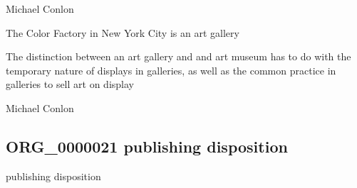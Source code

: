 \documentclass[letterpaper,10pt,english]{sphinxmanual}
\begin{document}
\begin{sphinxShadowBox}

\sphinxAtStartPar
Michael Conlon 
\end{sphinxShadowBox}

\begin{sphinxShadowBox}

\sphinxAtStartPar
The Color Factory in New York City is an art gallery
\end{sphinxShadowBox}

\begin{sphinxShadowBox}

\sphinxAtStartPar
The distinction between an art gallery and and art museum has to do with the temporary nature of displays in galleries, as well as the common practice in galleries to sell art on display
\end{sphinxShadowBox}

\begin{sphinxShadowBox}

\sphinxAtStartPar
Michael Conlon 
\end{sphinxShadowBox}
\begin{quote}

\ignorespaces \end{quote}


\subsection{ORG\_0000021 \sphinxhyphen{} publishing disposition}
\label{\detokenize{doc-ORG_0000021:org-0000021-publishing-disposition}}\label{\detokenize{doc-ORG_0000021:index-0}}\label{\detokenize{doc-ORG_0000021::doc}}
\begin{sphinxShadowBox}

\sphinxAtStartPar
publishing disposition
\end{sphinxShadowBox}

\begin{sphinxShadowBox}

\sphinxAtStartPar
{\hyperref[\detokenize{doc-BFO_0000016::doc}]{}}
\end{sphinxShadowBox}
\end{document}
